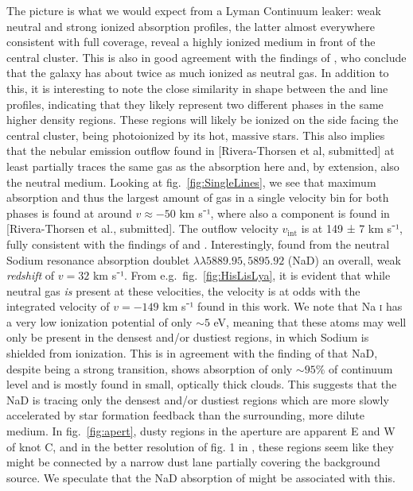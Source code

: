 \documentclass[twocolumn]{aastex61}
\begin{document}
The picture is what we would expect from a Lyman Continuum leaker: weak
neutral and strong ionized absorption profiles, the latter almost
everywhere consistent with full coverage, reveal a highly ionized medium
in front of the central cluster. This is also in good agreement with the
findings of \citet{Pardy2016arXiv}, who conclude that the galaxy has
about twice as much ionized as neutral gas. In addition to this, it is
interesting to note the close similarity in shape between the
 and  line profiles, indicating that they likely
represent two different phases in the same higher density regions. These
regions will likely be ionized on the side facing the central cluster,
being photoionized by its hot, massive stars. This also implies that the
nebular emission outflow found in {[}Rivera-Thorsen et al, submitted{]}
at least partially traces the same gas as the  absorption
here and, by extension, also the neutral medium. Looking at
fig.~\ref{fig:SingleLines}, we see that maximum absorption and thus the
largest amount of gas in a single velocity bin for both phases is found
at around $v \approx -50$ km s⁻¹, where also a component is found in
{[}Rivera-Thorsen et al., submitted{]}. The outflow velocity
$v_{\text{int}}$ is at 149 ± 7 km s⁻¹, fully consistent with the
findings of \citet{Heckman2015} and \citet{Alexandroff2015}.
Interestingly, \citet{Sandberg2013} found from the neutral Sodium
resonance absorption doublet $\lambda \lambda 5889.95,5895.92$ (NaD) an
overall, weak \emph{redshift} of $v = 32$ km s⁻¹. From
e.g.~fig.~\ref{fig:HisLisLya}, it is evident that while neutral gas
\emph{is} present at these velocities, the velocity is at odds with the
integrated velocity of $v = -149$ km s⁻¹ found in this work. We note
that Na \textsc{i} has a very low ionization potential of only $\sim 5$
eV, meaning that these atoms may well only be present in the densest
and/or dustiest regions, in which Sodium is shielded from ionization.
This is in agreement with the finding of \citet{Sandberg2013} that NaD,
despite being a strong transition, shows absorption of only $\sim 95\%$
of continuum level and is mostly found in small, optically thick clouds.
This suggests that the NaD is tracing only the densest and/or dustiest
regions which are more slowly accelerated by star formation feedback
than the surrounding, more dilute medium. In fig.~\ref{fig:apert}, dusty
regions in the aperture are apparent E and W of knot C, and in the
better resolution of fig. 1 in \citet{Adamo2010}, these regions seem
like they might be connected by a narrow dust lane partially covering
the background source. We speculate that the NaD absorption of
\citet{Sandberg2013} might be associated with this.
\end{document}
